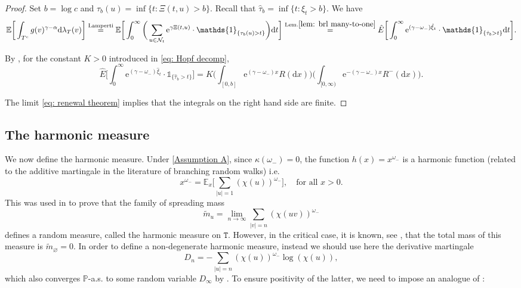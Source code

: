\documentclass[12pt]{article}
\numberwithin{equation}{section}
\theoremstyle{plain}
\theoremstyle{definition}
\newcommand{\D}{\mathrm{d}}
\begin{document}
\begin{proof}
 Set $b = \log c$ and $\tau_{b}(u) = \inf\{t: \Xi(t,u) > b\}$. Recall that $\hat{\tau}_{b} = \inf\{t: \hat{\xi}_t > b\}$. We have
\[\mathbb{E}\bigg[\int_{T^{c}}g(v)^{\gamma-\alpha}\D \lambda_T(v)\bigg] \stackrel{\mathrm{Lamperti}}{=} \mathbb{E}\bigg[\int^{\infty}_{0}\bigg(\sum_{u\in {\cal N}_t} \mathrm{e}^{\gamma\Xi(t,u)}\cdot \mathds{1}_{\{\tau_b(u)>t\}} \bigg)\D t \bigg]  \stackrel{\mathrm{Lem.} \ref{lem: brl many-to-one}}{=} \hat{E}\bigg[\int^{\infty}_0 \mathrm{e}^{(\gamma-\omega_-)\hat{\xi}_t}\cdot\mathds{1}_{\{\hat{\tau}_b>t\}}\D t\bigg]. \]

\noindent By \cite[Lemma 20, Chapter VI]{bertoin1996levy}, for the constant $K>0$ introduced in \eqref{eq: Hopf decomp},
\[\hat{E}\bigg[\int^{\infty}_0 \mathrm{e}^{(\gamma-\omega_-)\hat{\xi}_t}\cdot \mathds{1}_{\{\hat{\tau}_b>t\}}\bigg] = K\bigg(\int_{[0, b]}\mathrm{e}^{(\gamma-\omega_-)x}R(\D x)\bigg)\bigg(\int_{[0,\infty)}\mathrm{e}^{-(\gamma-\omega_-)x}R^-(\D x)\bigg). \]

\noindent The limit \eqref{eq: renewal theorem} implies that the integrals on the right hand side are finite.
\end{proof}


\subsection{The harmonic measure}\label{sec: harmonic measure}

We now define the harmonic measure.  Under \cref{Assumption A}, since $\kappa(\omega_-) = 0$, the function $h(x) = x^{\omega_-}$ is a harmonic function (related to the additive martingale in the literature of branching random walks) i.e.
\begin{equation}\label{eq: harmonic function}
x^{\omega_-} = \mathbb{E}_x\bigg[\sum_{|u|=1} (\chi(u))^{\omega_-}\bigg], \quad \mbox{for all }x>0.
\end{equation}
This was used in \cite[Section 2.3.2]{BertoinJean2024SMta} to prove that the family of spreading mass
\begin{equation}\label{eq: spread mass subcritical}
\widetilde{m}_u = \lim_{n\to\infty} \sum_{|v|=n}(\chi(uv))^{\omega_-}
\end{equation}
 defines a random measure, called the harmonic measure on $ \mathtt{T}$. However, in the critical case, it is known, see \cite[Theorem 3.2]{ShiZhan2016BRWE}, that the total mass of this measure is $\widetilde{m}_\varnothing =0$. In order to define a non-degenerate harmonic measure, instead we should use here the derivative martingale
\begin{equation}
D_n = -\sum_{|u| = n} (\chi(u))^{\omega_-}\log(\chi(u)),
\end{equation} which also converges $\mathbb{P}$-a.s. to some random variable $D_{\infty}$ by \cite[Theorem 5.2]{ShiZhan2016BRWE}. To ensure positivity of the latter, we need to impose an analogue of \cite[Assumption 2.13]{BertoinJean2024SMta}:
\end{document}
